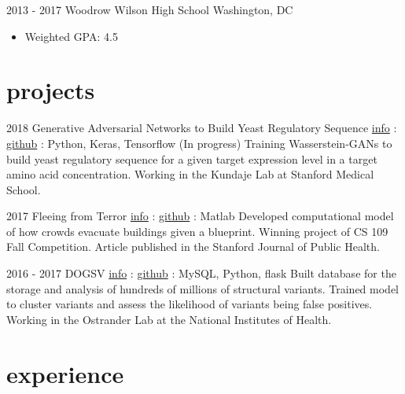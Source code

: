 \documentclass[]{resume}
\begin{document}
\begin{multicols}{2}
\begin{entrylist}
  \entry
    {2013 - 2017}
    {Woodrow Wilson High School}
    {Washington, DC}
    {\begin{itemize}[leftmargin=*]
          \item Weighted GPA: 4.5
     \end{itemize}}

\end{entrylist}

\par\vspace{-\parskip}

\section{projects}

\begin{entrylist}
  \entry
    {2018}
    {Generative Adversarial Networks to Build Yeast Regulatory Sequence}
    {\href{https://njw.fish/project/generative\%20genomics}{info} : \href{https://github.com/njwfish/mpra_yeast}{github} : Python, Keras, Tensorflow}
    {(In progress) Training Wasserstein-GANs to build yeast regulatory sequence for a given target expression level in a target amino acid concentration. Working in the Kundaje Lab at Stanford Medical School.}
    
  \entry
    {2017}
    {Fleeing from Terror}
    {\href{https://njw.fish/project/theater-safety}{info} : \href{https://github.com/njwfish/theater-safety}{github} : Matlab}
    {Developed computational model of how crowds evacuate buildings given a blueprint. Winning project of CS 109 Fall Competition. Article published in the Stanford Journal of Public Health.}
    
  \entry
    {2016 - 2017}
    {DOGSV}
    {\href{https://njw.fish/project/dogsv}{info} : \href{https://njw.fish/project/dogsv}{github} : MySQL, Python, flask}
    {Built database for the storage and analysis of hundreds of millions of structural variants. Trained model to cluster variants and assess the likelihood of variants being false positives. Working in the Ostrander Lab at the National Institutes of Health.}

\end{entrylist} 

\vspace{-6mm}
 
\section{experience}


\end{multicols}
\end{document}
